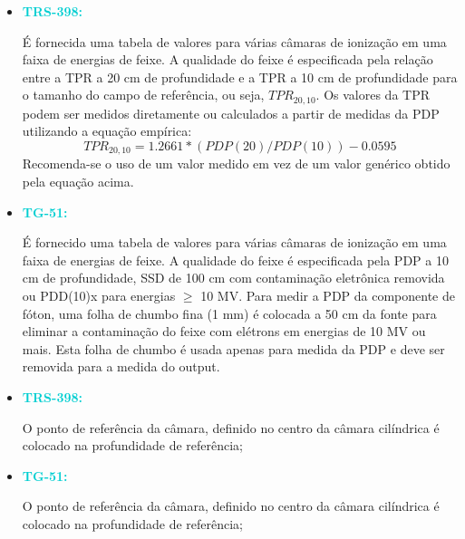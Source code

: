 \documentclass[11pt,a4paper]{article}
\newcounter{exemplo}
\begin{document}
	\begin{exemplo}
		\begin{itemize}
			\item \textcolor{DarkTurquoise}{\Large\LobsterTwo\textbf{TRS-398:}} 
			
			É fornecida uma tabela de valores para várias câmaras de ionização em uma faixa de energias de feixe. A qualidade do feixe é especificada pela relação entre a TPR a 20 cm de profundidade e a TPR a 10 cm de profundidade para o tamanho do campo de referência, ou seja, $TPR_{20,10}$. Os valores da TPR podem ser medidos diretamente ou calculados a partir de medidas da PDP utilizando a equação empírica: $$TPR_{20,10} = 1.2661* (PDP(20)/PDP(10)) - 0.0595$$ Recomenda-se o uso de um valor medido em vez de um valor genérico obtido pela equação acima.
			

			\item \textcolor{DarkTurquoise}{\Large\LobsterTwo\textbf{TG-51:}} 
			
			É fornecido uma tabela de valores para várias câmaras de ionização em uma faixa de energias de feixe. A qualidade do feixe é especificada pela PDP a 10 cm de profundidade, SSD de 100 cm com contaminação eletrônica removida ou PDD(10)x para energias $\geq$ 10 MV. Para medir a PDP da componente de fóton, uma folha de chumbo fina (1 mm) é colocada a 50 cm da fonte para eliminar a contaminação do feixe com elétrons em energias de 10 MV ou mais. Esta folha de chumbo é usada apenas para medida da PDP e deve ser removida para a medida do output.
		\end{itemize}
	\end{exemplo}

	\begin{exemplo}
		\begin{itemize}
			\item \textcolor{DarkTurquoise}{\Large\LobsterTwo\textbf{TRS-398:}}
			
			O ponto de referência da câmara, definido no centro da câmara cilíndrica é colocado na profundidade de referência;
			
			\item \textcolor{DarkTurquoise}{\Large\LobsterTwo\textbf{TG-51:}}
			
			O ponto de referência da câmara, definido no centro da câmara cilíndrica é colocado na profundidade de referência;
		\end{itemize}
	\end{exemplo}
\end{document}

